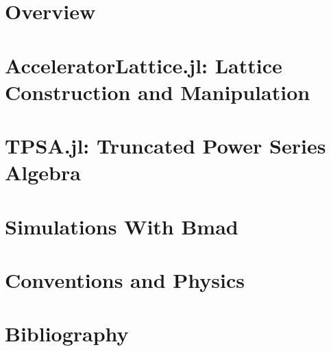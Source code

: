 \documentclass{book}
\begin{document}



\cleardoublepage
{} 
{}
\tableofcontents

\cleardoublepage
{} 
{} 
\listoffigures

\cleardoublepage
{} 
{} 
\listoftables

\setlength{\parskip}{\dPar}
\setlength{\parindent}{0ex}

\part{Overview}




\part{AcceleratorLattice.jl: Lattice Construction and Manipulation}




\part{TPSA.jl: Truncated Power Series Algebra}

\part{Simulations With Bmad}

\part{Conventions and Physics}

\part{Bibliography}

\cleardoublepage
{}
\end{document}
